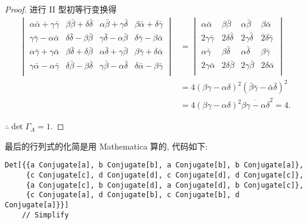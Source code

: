 \documentclass[color=black,device=normal,lang=cn,mode=geye]{elegantnote}
\begin{document}
\begin{landscape}
\begin{proof}
        进行 II 型初等行变换得
        \begin{align*}
            \begin{vmatrix}
                \alpha\bar{\alpha}+\gamma\bar{\gamma} & \beta\bar{\beta}+\delta\bar{\delta} & \alpha\bar{\beta}+\gamma\bar{\delta} & \beta\bar{\alpha}+\delta\bar{\gamma} \\
                \gamma\bar{\gamma}-\alpha\bar{\alpha} & \delta\bar{\delta}-\beta\bar{\beta} & \gamma\bar{\delta}-\alpha\bar{\beta} & \delta\bar{\gamma}-\beta\bar{\alpha} \\
                \alpha\bar{\gamma}+\gamma\bar{\alpha} & \beta\bar{\delta}+\delta\bar{\beta} & \alpha\bar{\delta}+\gamma\bar{\beta} & \beta\bar{\gamma}+\delta\bar{\alpha} \\
                \gamma\bar{\alpha}-\alpha\bar{\gamma} & \delta\bar{\beta}-\beta\bar{\delta} & \gamma\bar{\beta}-\alpha\bar{\delta} & \delta\bar{\alpha}-\beta\bar{\gamma} \\
            \end{vmatrix} & =\begin{vmatrix}
                \alpha\bar{\alpha} & \beta\bar{\beta} & \alpha\bar{\beta} & \beta\bar{\alpha} \\
                2\gamma\bar{\gamma} & 2\delta\bar{\delta} & 2\gamma\bar{\delta} & 2\delta\bar{\gamma} \\
                \alpha\bar{\gamma} & \beta\bar{\delta} & \alpha\bar{\delta} & \beta\bar{\gamma} \\
                2\gamma\bar{\alpha} & 2\delta\bar{\beta} & 2\gamma\bar{\beta} & 2\delta\bar{\alpha} \\
            \end{vmatrix} \\
            & =4(\beta\gamma-\alpha\delta)^2(\bar{\beta}\bar{\gamma}-\bar{\alpha}\bar{\delta})^2 \\
            & =4(\beta\gamma-\alpha\delta)^2\overline{\beta\gamma-\alpha\delta}^2=4.
        \end{align*}
    
        $\therefore\det\Gamma_A=1$.
    \end{proof}
\end{landscape}
\begin{note}
    最后的行列式的化简是用 Mathematica 算的, 代码如下:
    \begin{lstlisting}
Det[{{a Conjugate[a], b Conjugate[b], a Conjugate[b], b Conjugate[a]},
     {c Conjugate[c], d Conjugate[d], c Conjugate[d], d Conjugate[c]},
     {a Conjugate[c], b Conjugate[d], a Conjugate[d], b Conjugate[c]},
     {c Conjugate[a], d Conjugate[b], c Conjugate[b], d Conjugate[a]}}]
    // Simplify
    \end{lstlisting}
\end{note}
\printbibliography[heading=bibintoc, title=\ebibname]
\end{document}
